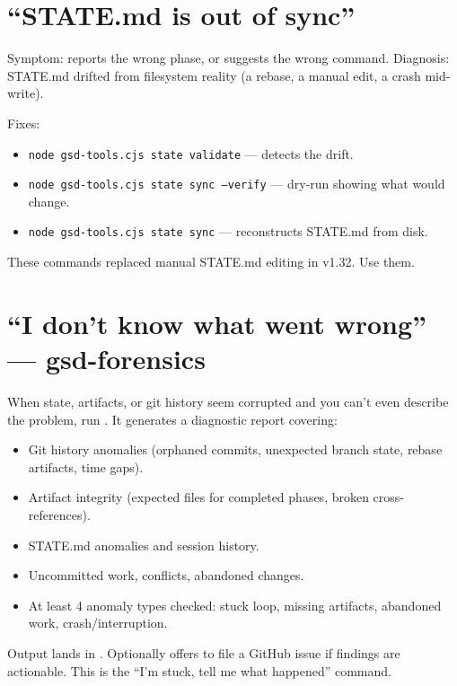 \documentclass[11pt,letterpaper,openany]{book}
\begin{document}
\section{``STATE.md is out of sync''}

Symptom:  reports the wrong phase, or  suggests the wrong command. Diagnosis: STATE.md drifted from filesystem reality (a rebase, a manual edit, a crash mid-write).

Fixes:
\begin{itemize}[itemsep=2pt]
  \item \texttt{node gsd-tools.cjs state validate} --- detects the drift.
  \item \texttt{node gsd-tools.cjs state sync --verify} --- dry-run showing what would change.
  \item \texttt{node gsd-tools.cjs state sync} --- reconstructs STATE.md from disk.
\end{itemize}

These commands replaced manual STATE.md editing in v1.32. Use them.

\section{``I don't know what went wrong'' --- gsd-forensics}

When state, artifacts, or git history seem corrupted and you can't even describe the problem, run . It generates a diagnostic report covering:

\begin{itemize}[itemsep=2pt]
  \item Git history anomalies (orphaned commits, unexpected branch state, rebase artifacts, time gaps).
  \item Artifact integrity (expected files for completed phases, broken cross-references).
  \item STATE.md anomalies and session history.
  \item Uncommitted work, conflicts, abandoned changes.
  \item At least 4 anomaly types checked: stuck loop, missing artifacts, abandoned work, crash/interruption.
\end{itemize}

Output lands in . Optionally offers to file a GitHub issue if findings are actionable. This is the ``I'm stuck, tell me what happened'' command.
\end{document}
